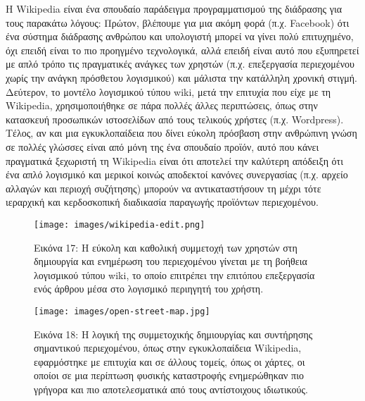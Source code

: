 \documentclass[
]{article}
\begin{document}
H Wikipedia είναι ένα σπουδαίο παράδειγμα προγραμματισμού της διάδρασης
για τους παρακάτω λόγους: Πρώτον, βλέπουμε για μια ακόμη φορά (π.χ.
Facebook) ότι ένα σύστημα διάδρασης ανθρώπου και υπολογιστή μπορεί να
γίνει πολύ επιτυχημένο, όχι επειδή είναι το πιο προηγμένο τεχνολογικά,
αλλά επειδή είναι αυτό που εξυπηρετεί με απλό τρόπο τις πραγματικές
ανάγκες των χρηστών (π.χ. επεξεργασία περιεχομένου χωρίς την ανάγκη
πρόσθετου λογισμικού) και μάλιστα την κατάλληλη χρονική στιγμή.
Δεύτερον, το μοντέλο λογισμικού τύπου wiki, μετά την επιτυχία που είχε
με τη Wikipedia, χρησιμοποιήθηκε σε πάρα πολλές άλλες περιπτώσεις, όπως
στην κατασκευή προσωπικών ιστοσελίδων από τους τελικούς χρήστες (π.χ.
Wordpress). Τέλος, αν και μια εγκυκλοπαίδεια που δίνει εύκολη πρόσβαση
στην ανθρώπινη γνώση σε πολλές γλώσσες είναι από μόνη της ένα σπουδαίο
προϊόν, αυτό που κάνει πραγματικά ξεχωριστή τη Wikipedia είναι ότι
αποτελεί την καλύτερη απόδειξη ότι ένα απλό λογισμικό και μερικοί κοινώς
αποδεκτοί κανόνες συνεργασίας (π.χ. αρχείο αλλαγών και περιοχή
συζήτησης) μπορούν να αντικαταστήσουν τη μέχρι τότε ιεραρχική και
κερδοσκοπική διαδικασία παραγωγής προϊόντων περιεχομένου.

\leavevmode{}%
\begin{figure}
\hypertarget{fig:wikipedia-edit}{%
\centering
\texttt{[image: images/wikipedia-edit.png]}
\caption{Εικόνα 17: Η εύκολη και καθολική συμμετοχή των χρηστών στη
δημιουργία και ενημέρωση του περιεχομένου γίνεται με τη βοήθεια
λογισμικού τύπου wiki, το οποίο επιτρέπει την επιτόπου επεξεργασία ενός
άρθρου μέσα στο λογισμικό περιηγητή του
χρήστη.}\label{fig:wikipedia-edit}
}
\end{figure}

\leavevmode{}%
\begin{figure}
\hypertarget{fig:open-street-map}{%
\centering
\texttt{[image: images/open-street-map.jpg]}
\caption{Εικόνα 18: Η λογική της συμμετοχικής δημιουργίας και συντήρησης
σημαντικού περιεχομένου, όπως στην εγκυκλοπαίδεια Wikipedia, εφαρμόστηκε
με επιτυχία και σε άλλους τομείς, όπως οι χάρτες, οι οποίοι σε μια
περίπτωση φυσικής καταστροφής ενημερώθηκαν πιο γρήγορα και πιο
αποτελεσματικά από τους αντίστοιχους
ιδιωτικούς.}\label{fig:open-street-map}
}
\end{figure}
\end{document}
